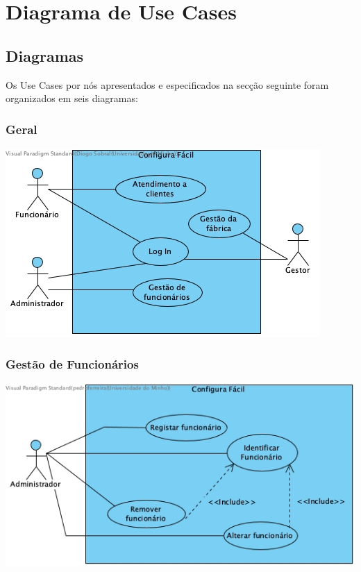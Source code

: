 \section{Diagrama de Use Cases}
\label{useCases}
\subsection{Diagramas}
Os Use Cases por nós apresentados e especificados na secção seguinte foram organizados em seis diagramas:

\subsubsection{Geral}
		\begin{center}
 			\includegraphics[scale = 0.7]{D_USECASE/Geral.jpg}
		\end{center}
\subsubsection{Gestão de Funcionários}
		\begin{center}
 			\includegraphics[scale = 0.7]{D_USECASE/Gestao_de_funcionarios.jpg}
		\end{center}\newpage
